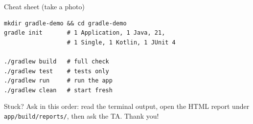 \documentclass[11pt,aspectratio=169]{beamer}
\begin{document}
\begin{frame}[fragile]{Cheat sheet (take a photo)}
  \begin{lstlisting}
mkdir gradle-demo && cd gradle-demo
gradle init       # 1 Application, 1 Java, 21,
                  # 1 Single, 1 Kotlin, 1 JUnit 4

./gradlew build   # full check
./gradlew test    # tests only
./gradlew run     # run the app
./gradlew clean   # start fresh
  \end{lstlisting}
  Stuck? Ask in this order: read the terminal output, open the HTML report
  under \texttt{app/build/reports/}, then ask the TA. Thank you!
\end{frame}
\end{document}

